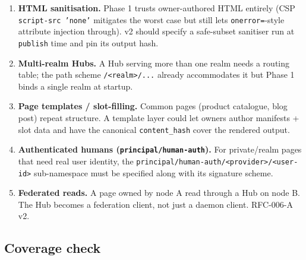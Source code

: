 \documentclass[11pt,a4paper]{article}
\theoremstyle{definition}
\begin{document}
\begin{enumerate}[leftmargin=2.2em,itemsep=0.2em]
    \item \textbf{HTML sanitisation.} Phase 1 trusts owner-authored
    HTML entirely (CSP \texttt{script-src 'none'} mitigates the
    worst case but still lets \texttt{onerror=}-style attribute
    injection through). v2 should specify a safe-subset
    sanitiser run at \texttt{publish} time and pin its output
    hash.
    \item \textbf{Multi-realm Hubs.} A Hub serving more than one
    realm needs a routing table; the path scheme
    \texttt{/<realm>/...} already accommodates it but Phase 1
    binds a single realm at startup.
    \item \textbf{Page templates / slot-filling.} Common pages
    (product catalogue, blog post) repeat structure. A template
    layer could let owners author manifests + slot data and
    have the canonical \texttt{content\_hash} cover the
    rendered output.
    \item \textbf{Authenticated humans
    (\texttt{principal/human-auth}).} For private/realm pages
    that need real user identity, the
    \texttt{principal/human-auth/<provider>/<user-id>} sub-namespace
    must be specified along with its signature scheme.
    \item \textbf{Federated reads.} A page owned by node A read
    through a Hub on node B. The Hub becomes a federation
    client, not just a daemon client. RFC-006-A v2.
\end{enumerate}

\subsection{Coverage check}
\end{document}
